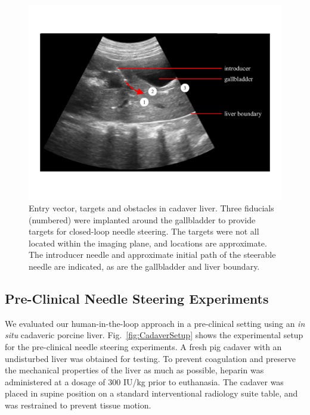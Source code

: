\begin{figure}[!t]
\centering
\includegraphics[width = \columnwidth]{./Images/Chapter5/CadaverTargetsUS/CadaverTargetsUS.pdf}%
\caption[Entry vector, targets and obstacles in cadaver liver]{Entry vector, targets and obstacles in cadaver liver. Three fiducials (numbered) were implanted around the gallbladder to provide targets for closed-loop needle steering. The targets were not all located within the imaging plane, and locations are approximate. The introducer needle and approximate initial path of the steerable needle are indicated, as are the gallbladder and liver boundary. }
\label{fig:CadaverTargetsUS}
\end{figure} 

\subsection{Pre-Clinical Needle Steering Experiments}
We evaluated our human-in-the-loop approach in a pre-clinical setting using an \textit{in situ} cadaveric porcine liver. Fig.~\ref{fig:CadaverSetup} shows the experimental setup for the pre-clinical needle steering experiments. A fresh pig cadaver with an undisturbed liver was obtained for testing. To prevent coagulation and preserve the mechanical properties of the liver as much as possible, heparin was administered at a dosage of 300 IU/kg prior to euthanasia. The cadaver was placed in supine position on a standard interventional radiology suite table, and was restrained to prevent tissue motion. 

